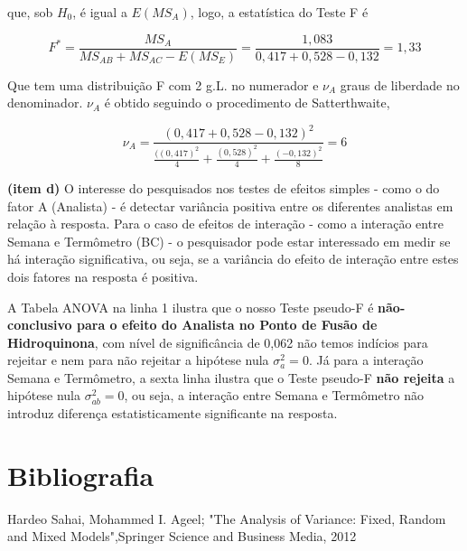 \documentclass[12pt]{article}
\begin{document}
que, sob $H_0$, é igual a $E(MS_A)$, logo, a estatística do Teste F é 

$$F^* = \frac{MS_A}{MS_{AB} + MS_{AC} - E(MS_E)} = \frac{1,083}{0,417 + 0,528 - 0,132} = 1,33$$

Que tem uma distribuição F com 2 g.L. no numerador e $\nu_A$ graus de liberdade no denominador. $\nu_A$ é obtido seguindo o procedimento de Satterthwaite,

$$\nu_A = \frac{(0,417 + 0,528 - 0,132)^2}{\frac{((0,417)^2}{4} + \frac{(0,528)^2}{4} + \frac{(-0,132)^2}{8}} = 6 $$

\textbf{(item d)} O interesse do pesquisados nos testes de efeitos simples - como o do fator A (Analista) - é detectar variância positiva entre os diferentes analistas em relação à resposta. Para o caso de efeitos de interação - como a interação entre Semana e Termômetro (BC) - o pesquisador pode estar interessado em medir se há interação significativa, ou seja, se a variância do efeito de interação entre estes dois fatores na resposta é positiva.

A Tabela ANOVA na linha 1  ilustra que o nosso Teste pseudo-F é \textbf{não-conclusivo para o efeito do Analista no Ponto de Fusão de Hidroquinona}, com nível de significância de 0,062 não temos indícios para rejeitar e nem para não rejeitar a hipótese nula $\sigma_a^2
= 0$. Já para a interação Semana e Termômetro, a sexta linha ilustra que o Teste pseudo-F \textbf{não rejeita} a hipótese nula $\sigma_{ab}^2 = 0 $, ou seja, a interação entre Semana e Termômetro não introduz diferença estatisticamente significante na resposta. 

\newpage
\section*{Bibliografia}
Hardeo Sahai, Mohammed I. Ageel; "The Analysis of Variance: Fixed, Random and Mixed Models",Springer Science and Business Media, 2012
\end{document}
